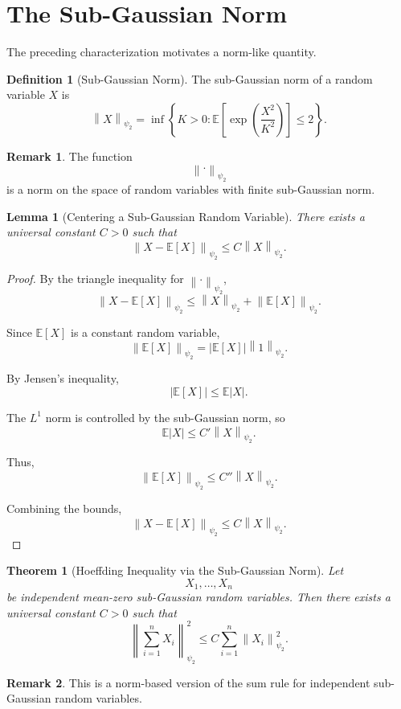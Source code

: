 \documentclass[12pt,oneside]{book}
\numberwithin{equation}{section}
\theoremstyle{definition}
\newtheorem{definition}{Definition}[section]
\newtheorem{remark}{Remark}[section]
\theoremstyle{plain}
\newtheorem{theorem}{Theorem}[section]
\newtheorem{lemma}{Lemma}[section]
\theoremstyle{remark}
\newcommand{\E}{\mathbb{E}}
\newcommand{\norm}[1]{\left\lVert #1 \right\rVert}
\begin{document}
\section{The Sub-Gaussian Norm}

The preceding characterization motivates a norm-like quantity.

\begin{definition}[Sub-Gaussian Norm]
The sub-Gaussian norm of a random variable $X$ is
\[
\norm{X}_{\psi_2}
=
\inf\left\{
K>0:
\E\left[
\exp\left(
\frac{X^2}{K^2}
\right)
\right]
\leq
2
\right\}.
\]
\end{definition}

\begin{remark}
The function
\[
\norm{\cdot}_{\psi_2}
\]
is a norm on the space of random variables with finite sub-Gaussian norm.
\end{remark}

\begin{lemma}[Centering a Sub-Gaussian Random Variable]
There exists a universal constant $C>0$ such that
\[
\norm{X-\E[X]}_{\psi_2}
\leq
C\norm{X}_{\psi_2}.
\]
\end{lemma}

\begin{proof}
By the triangle inequality for $\norm{\cdot}_{\psi_2}$,
\[
\norm{X-\E[X]}_{\psi_2}
\leq
\norm{X}_{\psi_2}
+
\norm{\E[X]}_{\psi_2}.
\]

Since $\E[X]$ is a constant random variable,
\[
\norm{\E[X]}_{\psi_2}
=
|\E[X]|\norm{1}_{\psi_2}.
\]

By Jensen's inequality,
\[
|\E[X]|
\leq
\E|X|.
\]

The $L^1$ norm is controlled by the sub-Gaussian norm, so
\[
\E|X|
\leq
C'\norm{X}_{\psi_2}.
\]

Thus,
\[
\norm{\E[X]}_{\psi_2}
\leq
C''\norm{X}_{\psi_2}.
\]

Combining the bounds,
\[
\norm{X-\E[X]}_{\psi_2}
\leq
C\norm{X}_{\psi_2}.
\]
\end{proof}

\begin{theorem}[Hoeffding Inequality via the Sub-Gaussian Norm]
Let
\[
X_1,\dots,X_n
\]
be independent mean-zero sub-Gaussian random variables. Then there exists a universal constant $C>0$ such that
\[
\norm{\sum_{i=1}^n X_i}_{\psi_2}^2
\leq
C\sum_{i=1}^n \norm{X_i}_{\psi_2}^2.
\]
\end{theorem}

\begin{remark}
This is a norm-based version of the sum rule for independent sub-Gaussian random variables.
\end{remark}
\end{document}
